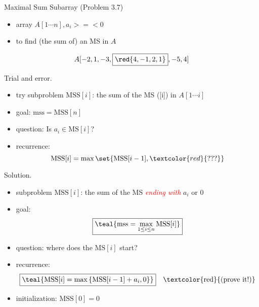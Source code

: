 
\begin{frame}{}
  \begin{exampleblock}{Maximal Sum Subarray (Problem $3.7$)}
    \begin{itemize}
      \item array $A[1 \cdots n], a_{i} >=< 0$
      \item to find (the sum of) an MS in $A$
    \end{itemize}
	
    \[
      A[-2,1 ,-3, \boxed{\red{4,-1,2,1}} ,-5,4]
    \]
  \end{exampleblock}

  \pause
  \vspace{0.30cm}
  \begin{alertblock}{Trial and error.}
    \begin{itemize}
      \item try subproblem $\text{MSS}[i]$: the sum of the MS ([i]) in $A[1 \cdots i]$
      \item goal: $\text{mss} = \text{MSS}[n]$
	\pause
      \item question: Is $a_{i} \in \text{MS}[i]$?
      \item recurrence: 
	\[ 
	  \text{MSS}[i] = \max \set{\text{MSS}[i-1], \textcolor{red}{???}}
	\]
    \end{itemize}
  \end{alertblock}
\end{frame}

\begin{frame}{}
  \begin{block}{Solution.}
    \begin{itemize}
      \item subproblem $\text{MSS}[i]$: the sum of the MS \textcolor{red}{\it ending with} $a_{i}$ or 0
      \item goal: 
	\[
	  \boxed{\teal{\text{mss} = \max\limits_{1 \le i \le n} \text{MSS}[i]}}
	\]
      \item<2-> question: where does the $\text{MS}[i]$ start?
      \item<2-> recurrence: 
	\[ 
	  \boxed{\teal{\text{MSS}[i] = \max \left\{\text{MSS}[i-1] + a_{i}, 0\right\}}} \quad \text{\textcolor{red}{(prove it!)}}
	\]
      \item<3-> initialization: $\text{MSS}[0] = 0$
    \end{itemize}

  \end{block}
\end{frame}

